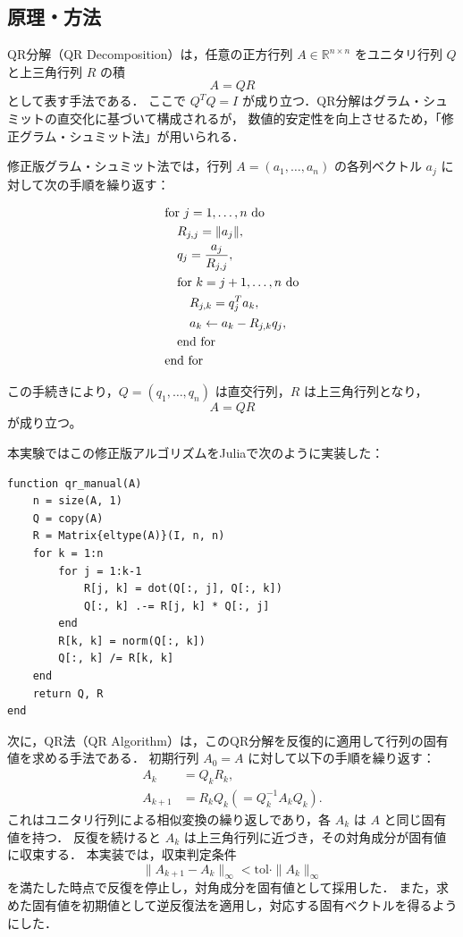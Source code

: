 \documentclass[a4paper,11pt]{ltjsarticle}
\begin{document}
\subsection{原理・方法}

QR分解（QR Decomposition）は，任意の正方行列 $A \in \mathbb{R}^{n\times n}$ をユニタリ行列 $Q$ と上三角行列 $R$ の積
\[
A = QR
\]
として表す手法である\cite{exp2025}．
ここで $Q^TQ = I$ が成り立つ．QR分解はグラム・シュミットの直交化に基づいて構成されるが，
数値的安定性を向上させるため，「修正グラム・シュミット法」が用いられる\cite{exp2025}．

修正版グラム・シュミット法では，行列 $A = (a_{1}, \ldots, a_{n})$ の各列ベクトル $a_{j}$ に対して次の手順を繰り返す：

\begin{align}
&\text{for } j = 1, \ldots, n \text{ do} \notag\\
&\quad R_{j,j} = \|a_{j}\|, \\
&\quad q_{j} = \frac{a_{j}}{R_{j,j}}, \\
&\quad \text{for } k = j+1, \ldots, n \text{ do} \notag\\
&\qquad R_{j,k} = q_{j}^{T} a_{k}, \\
&\qquad a_{k} \leftarrow a_{k} - R_{j,k} q_{j}, \\
&\quad \text{end for} \notag\\
&\text{end for} \notag
\end{align}

この手続きにより，$Q = (q_{1}, \ldots, q_{n})$ は直交行列，$R$ は上三角行列となり，
\[
A = QR
\]
が成り立つ。

本実験ではこの修正版アルゴリズムをJuliaで次のように実装した：

\begin{verbatim}
function qr_manual(A)
    n = size(A, 1)
    Q = copy(A)
    R = Matrix{eltype(A)}(I, n, n)
    for k = 1:n
        for j = 1:k-1
            R[j, k] = dot(Q[:, j], Q[:, k])
            Q[:, k] .-= R[j, k] * Q[:, j]
        end
        R[k, k] = norm(Q[:, k])
        Q[:, k] /= R[k, k]
    end
    return Q, R
end
\end{verbatim}

次に，QR法（QR Algorithm）は，このQR分解を反復的に適用して行列の固有値を求める手法である{\cite{exp2025}}．
初期行列 $A_{0} = A$ に対して以下の手順を繰り返す：
\begin{align}
A_{k} &= Q_{k} R_{k}, \\
A_{k+1} &= R_{k} Q_{k} (= Q_{k}^{-1} A_{k} Q_{k}).
\end{align}
これはユニタリ行列による相似変換の繰り返しであり，各 $A_{k}$ は $A$ と同じ固有値を持つ．
反復を続けると $A_{k}$ は上三角行列に近づき，その対角成分が固有値に収束する．
本実装では，収束判定条件
\[
\|A_{k+1} - A_k\|_{\infty} < \mathrm{tol} \cdot \|A_k\|_{\infty}
\]
を満たした時点で反復を停止し，対角成分を固有値として採用した．
また，求めた固有値を初期値として逆反復法を適用し，対応する固有ベクトルを得るようにした．
\end{document}
